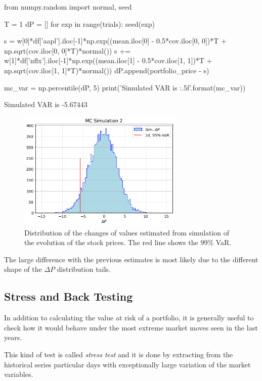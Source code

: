 \begin{ipython}
from numpy.random import normal, seed

T = 1
dP = []
for exp in range(trials):
	seed(exp)

    s = w[0]*df['aapl'].iloc[-1]*np.exp((mean.iloc[0] - 0.5*cov.iloc[0, 0])*T + 
        np.sqrt(cov.iloc[0, 0]*T)*normal())
    s += w[1]*df['nflx'].iloc[-1]*np.exp((mean.iloc[1] - 0.5*cov.iloc[1, 1])*T + 
         np.sqrt(cov.iloc[1, 1]*T)*normal())
    dP.append(portfolio_price - s)

mc_var = np.percentile(dP, 5)
print('Simulated VAR is {:.5f}'.format(mc_var))
\end{ipython}
\begin{ioutput}
Simulated VAR is -5.67443
\end{ioutput}

\begin{figure}[htb]
\centering
\includegraphics[width=0.7\textwidth]{figures/sim2_var}
\caption{Distribution of the changes of values estimated from simulation of the evolution of the stock prices. The red line shows the 99\% VaR.}
\label{fig:mc2_var}
\end{figure}

The large difference with the previous estimates is most likely due to the different shape of the $\Delta P$ distribution tails.

\subsection{Stress and Back Testing}
\label{stress-testing-and-back-testing}

In addition to calculating the value at risk of a portfolio, it is generally useful to check how it would behave under the most extreme market moves seen in the last years.

This kind of test is called \emph{stress test} and it is done by extracting from the historical series particular days with exceptionally large variation of the market variables.
 
